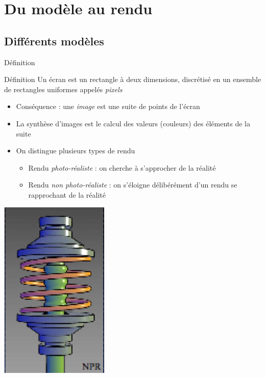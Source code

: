 \section{Du modèle au rendu}

\subsection{Différents modèles}

\begin{frame}{Définition}
\begin{block}{Définition}
Un écran est un rectangle à deux dimensions, discrétisé en un ensemble de rectangles uniformes appelés \textit{pixels}
\end{block}
\begin{itemize}
\item Conséquence : une \textit{image} est une suite de points de l'écran
\item La synthèse d'images est le calcul des valeurs (couleurs) des éléments de la suite
\item On distingue plusieurs types de rendu
\begin{itemize}
\item Rendu \textit{photo-réaliste} : on cherche à s'approcher de la réalité
\item Rendu \textit{non photo-réaliste} : on s'éloigne délibérément d'un rendu se rapprochant de la réalité
\end{itemize}
\end{itemize}
\begin{center}
\includegraphics[height=0.25\textheight]{figs/nprcao.png}
\hspace{0.1cm}

\end{center}
\end{frame}
